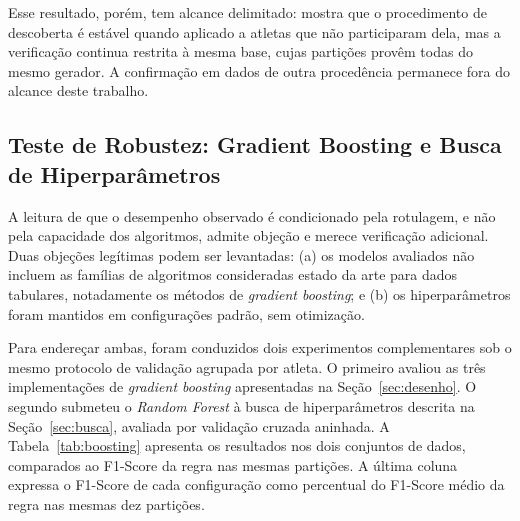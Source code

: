 Esse resultado, porém, tem alcance delimitado: mostra que o procedimento de descoberta é estável quando aplicado a atletas que não participaram dela, mas a verificação continua restrita à mesma base, cujas partições provêm todas do mesmo gerador. A confirmação em dados de outra procedência permanece fora do alcance deste trabalho.

\subsection[Teste de Robustez: Gradient Boosting e Busca de \mbox{HIPERPARÂMETROS}]{Teste de Robustez: Gradient Boosting e Busca de Hiperparâmetros}
\label{sec:boosting}

A leitura de que o desempenho observado é condicionado pela rotulagem, e não pela capacidade dos algoritmos, admite objeção e merece verificação adicional. Duas objeções legítimas podem ser levantadas: (a) os modelos avaliados não incluem as famílias de algoritmos consideradas estado da arte para dados tabulares, notadamente os métodos de \textit{gradient boosting}; e (b) os hiperparâmetros foram mantidos em configurações padrão, sem otimização.

Para endereçar ambas, foram conduzidos dois experimentos complementares sob o mesmo protocolo de validação agrupada por atleta. O primeiro avaliou as três implementações de \textit{gradient boosting} apresentadas na Seção~\ref{sec:desenho}. O segundo submeteu o \textit{Random Forest} à busca de hiperparâmetros descrita na Seção~\ref{sec:busca}, avaliada por validação cruzada aninhada. A Tabela~\ref{tab:boosting} apresenta os resultados nos dois conjuntos de dados, comparados ao F1-Score da regra nas mesmas partições. A última coluna expressa o F1-Score de cada configuração como percentual do F1-Score médio da regra nas mesmas dez partições.

